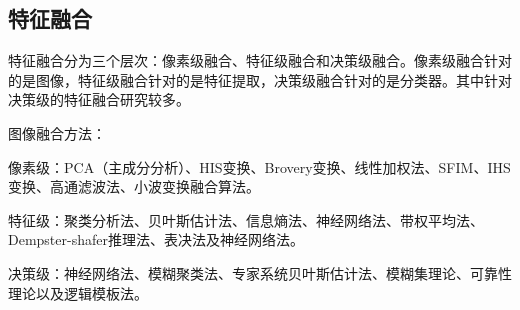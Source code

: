 \subsection{特征融合}
特征融合分为三个层次：像素级融合、特征级融合和决策级融合。像素级融合针对的是图像，特征级融合针对的是特征提取，决策级融合针对的是分类器。其中针对决策级的特征融合研究较多。

图像融合方法：

像素级：PCA（主成分分析）、HIS变换、Brovery变换、线性加权法、SFIM、IHS变换、高通滤波法、小波变换融合算法。

特征级：聚类分析法、贝叶斯估计法、信息熵法、神经网络法、带权平均法、Dempster-shafer推理法、表决法及神经网络法。

决策级：神经网络法、模糊聚类法、专家系统贝叶斯估计法、模糊集理论、可靠性理论以及逻辑模板法。




\begin{comment}
\begin{itemize}
\item 基于灰度共生矩阵的方法
\item 灰度-梯度共生矩阵分析法
\item 灰度行程长度统计法
\item 小波分析法
\item 基于Gabor小波变换的纹理分析法
\end{itemize}
\end{comment}